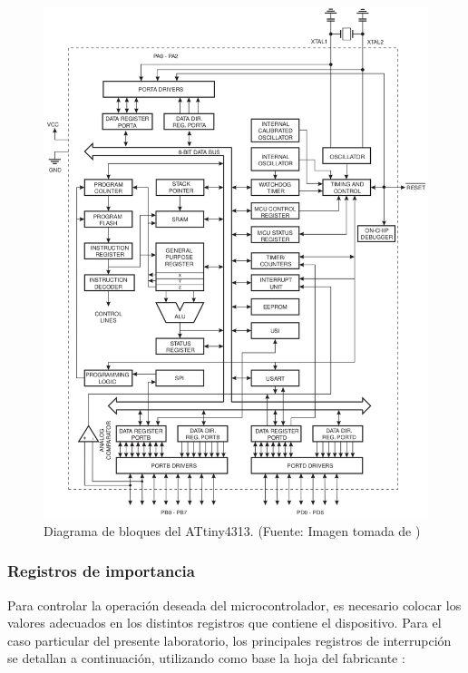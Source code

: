 \begin{figure}[H]
\centering
\includegraphics[width=160mm]{./Figuras/Nota_teorica/DBLO}
\caption{Diagrama de bloques del ATtiny4313. (Fuente: Imagen tomada de \cite{AT})}
\label{fig:DBLO}
\end{figure}

\subsubsection{Registros de importancia}
Para controlar la operación deseada del microcontrolador, es necesario colocar los valores adecuados en los distintos registros que contiene el dispositivo. Para el caso particular del presente laboratorio, los principales registros de interrupción se detallan a continuación, utilizando como base la hoja del fabricante \cite{AT}:

